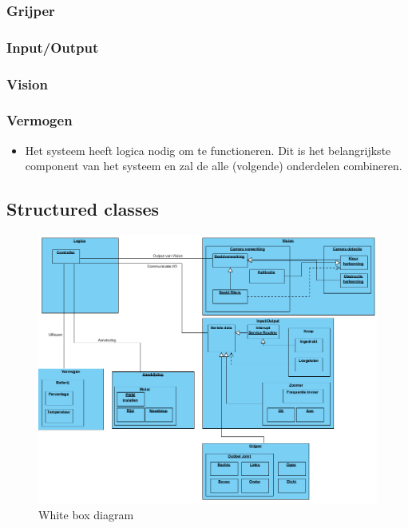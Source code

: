 \documentclass[12pt]{article} %
\begin{document}
\subsubsection{Grijper}
\subsubsection{Input/Output}
\subsubsection{Vision}
\subsubsection{Vermogen}

\begin{itemize}
\item Het systeem heeft logica nodig om te functioneren. Dit is het belangrijkste component van het systeem en zal de alle (volgende) onderdelen combineren.
\end{itemize}

\subsection{Structured classes}
\begin{center}
\begin{figure}[h]
\includegraphics[scale=.6]{WhiteBoxDiagram.png}
\caption{White box diagram}
\label{fig:deployment}
\end{figure}
\end{center}
\clearpage
\newpage
\end{document}
